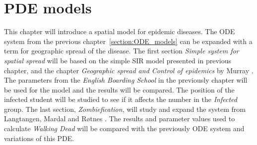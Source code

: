 \documentclass[%
twoside,                 %
final,                   %
chapterprefix=true,      %
open=right               %
10pt]{book}
\begin{document}
\chapter{PDE models}
This chapter will introduce a spatial model for epidemic diseases. The ODE system from the previous chapter~\ref{section:ODE_models} can be expanded with a term for geographic spread of the disease. The first section \emph{Simple system for spatial spread} will be based on the simple SIR model presented in previous chapter, and the chapter \emph{Geographic spread and Control of epidemics} by Murray \cite{murray2003mathematical}. The parameters from the \emph{English Boarding School} in the previously chapter will be used for the model and the results will be compared. The position of the infected student will be studied to see if it affects the number in the \emph{Infected} group. The last section, \emph{Zombiefication}, will study and expand the system from Langtangen, Mardal and Røtnes \cite{zombie-math}. The results and parameter values used to calculate \emph{Walking Dead} will be compared with the previously ODE system and variations of this PDE. 
\end{document}
